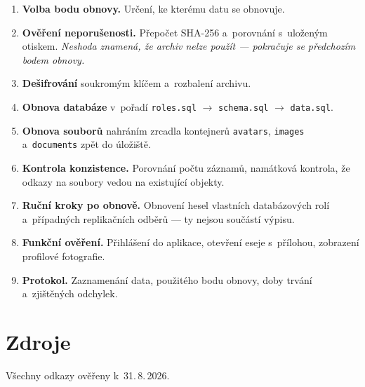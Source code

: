 \documentclass[11pt,a4paper]{article}
\begin{document}
\begin{enumerate}[leftmargin=1.6em]
  \item \textbf{Volba bodu obnovy.} Určení, ke kterému datu se obnovuje.
  \item \textbf{Ověření neporušenosti.} Přepočet SHA-256 a~porovnání s~uloženým otiskem.
        \emph{Neshoda znamená, že archiv nelze použít --- pokračuje se předchozím bodem obnovy.}
  \item \textbf{Dešifrování} soukromým klíčem a~rozbalení archivu.
  \item \textbf{Obnova databáze} v~pořadí \texttt{roles.sql} $\rightarrow$ \texttt{schema.sql}
        $\rightarrow$ \texttt{data.sql}.
  \item \textbf{Obnova souborů} nahráním zrcadla kontejnerů \texttt{avatars}, \texttt{images}
        a~\texttt{documents} zpět do úložiště.
  \item \textbf{Kontrola konzistence.} Porovnání počtu záznamů, namátková kontrola, že odkazy na
        soubory vedou na existující objekty.
  \item \textbf{Ruční kroky po obnově.} Obnovení hesel vlastních databázových rolí a~případných
        replikačních odběrů --- ty nejsou součástí výpisu.
  \item \textbf{Funkční ověření.} Přihlášení do aplikace, otevření eseje s~přílohou, zobrazení
        profilové fotografie.
  \item \textbf{Protokol.} Zaznamenání data, použitého bodu obnovy, doby trvání a~zjištěných
        odchylek.
\end{enumerate}

\newpage

\section{Zdroje}
\label{sec:zdroje}

Všechny odkazy ověřeny k~31.\,8.\,2026.
\end{document}
